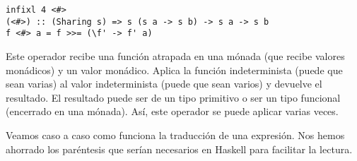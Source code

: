 \documentclass[class=article, crop=false]{standalone}
\begin{document}
\begin{verbatim}
infixl 4 <#>
(<#>) :: (Sharing s) => s (s a -> s b) -> s a -> s b
f <#> a = f >>= (\f' -> f' a)
\end{verbatim}

Este operador recibe una función atrapada en una mónada (que recibe valores monádicos) y un
valor monádico. Aplica la función indeterminista (puede que sean varias) al valor
indeterminista (puede que sean varios) y devuelve el resultado. El resultado puede ser de un
tipo primitivo o ser un tipo funcional (encerrado en una mónada). Así, este operador se puede
aplicar varias veces.

Veamos caso a caso como funciona la traducción de una expresión. Nos hemos ahorrado los
paréntesis que serían necesarios en Haskell para facilitar la lectura.
\end{document}
